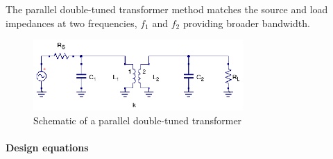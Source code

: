 \noindent The parallel double-tuned transformer method matches the source and load impedances at two frequencies, $f_1$ and $f_2$ providing broader bandwidth.

\begin{figure}[H]
\centering
\includegraphics[width=80mm]{parallel-double-tuned-transformer}
\caption{Schematic of a parallel double-tuned transformer}
\label{fig:parallel-double-tuned-transformer}
\end{figure}

\paragraph{Design equations \cite{RFMW_amp_osc_Abrie}}

